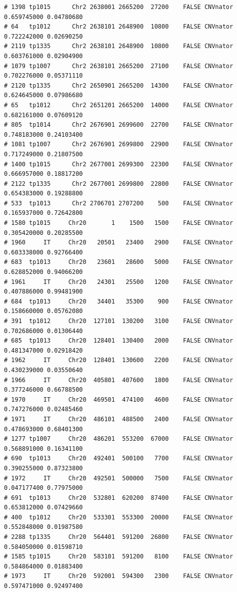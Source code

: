 \documentclass{article}\usepackage[]{graphicx}\usepackage[]{color}
\makeatletter
\newenvironment{kframe}{%
 \def\at@end@of@kframe{}%
 \ifinner\ifhmode%
  \def\at@end@of@kframe{\end{minipage}}%
  \begin{minipage}{\columnwidth}%
 \fi\fi%
 \def\FrameCommand##1{\hskip\@totalleftmargin \hskip-\fboxsep
 \colorbox{shadecolor}{##1}\hskip-\fboxsep
     \hskip-\linewidth \hskip-\@totalleftmargin \hskip\columnwidth}%
 \MakeFramed {\advance\hsize-\width
   \@totalleftmargin\z@ \linewidth\hsize
   \@setminipage}}%
 {\par\unskip\endMakeFramed%
 \at@end@of@kframe}
\newenvironment{knitrout}{}{} %
\makeatother
\begin{document}
\begin{knitrout}
\begin{kframe}
\begin{verbatim}
# 1398 tp1015      Chr2 2638001 2665200  27200    FALSE CNVnator 0.659745000 0.04780680
# 64   tp1012      Chr2 2638101 2648900  10800    FALSE CNVnator 0.722242000 0.02690250
# 2119 tp1335      Chr2 2638101 2648900  10800    FALSE CNVnator 0.603761000 0.02904900
# 1079 tp1007      Chr2 2638101 2665200  27100    FALSE CNVnator 0.702276000 0.05371110
# 2120 tp1335      Chr2 2650901 2665200  14300    FALSE CNVnator 0.624645000 0.07986680
# 65   tp1012      Chr2 2651201 2665200  14000    FALSE CNVnator 0.682161000 0.07609120
# 805  tp1014      Chr2 2676901 2699600  22700    FALSE CNVnator 0.748183000 0.24103400
# 1081 tp1007      Chr2 2676901 2699800  22900    FALSE CNVnator 0.717249000 0.21807500
# 1400 tp1015      Chr2 2677001 2699300  22300    FALSE CNVnator 0.666957000 0.18817200
# 2122 tp1335      Chr2 2677001 2699800  22800    FALSE CNVnator 0.654383000 0.19288800
# 533  tp1013      Chr2 2706701 2707200    500    FALSE CNVnator 0.165937000 0.72642800
# 1580 tp1015     Chr20       1    1500   1500    FALSE CNVnator 0.305420000 0.20285500
# 1960     IT     Chr20   20501   23400   2900    FALSE CNVnator 0.603338000 0.92766400
# 683  tp1013     Chr20   23601   28600   5000    FALSE CNVnator 0.628852000 0.94066200
# 1961     IT     Chr20   24301   25500   1200    FALSE CNVnator 0.407886000 0.99481900
# 684  tp1013     Chr20   34401   35300    900    FALSE CNVnator 0.158660000 0.05762080
# 391  tp1012     Chr20  127101  130200   3100    FALSE CNVnator 0.702686000 0.01306440
# 685  tp1013     Chr20  128401  130400   2000    FALSE CNVnator 0.481347000 0.02918420
# 1962     IT     Chr20  128401  130600   2200    FALSE CNVnator 0.430239000 0.03550640
# 1966     IT     Chr20  405801  407600   1800    FALSE CNVnator 0.377246000 0.66788500
# 1970     IT     Chr20  469501  474100   4600    FALSE CNVnator 0.747276000 0.02485460
# 1971     IT     Chr20  486101  488500   2400    FALSE CNVnator 0.478693000 0.68401300
# 1277 tp1007     Chr20  486201  553200  67000    FALSE CNVnator 0.568891000 0.16341100
# 690  tp1013     Chr20  492401  500100   7700    FALSE CNVnator 0.390255000 0.87323800
# 1972     IT     Chr20  492501  500000   7500    FALSE CNVnator 0.047177400 0.77975000
# 691  tp1013     Chr20  532801  620200  87400    FALSE CNVnator 0.653812000 0.07429660
# 400  tp1012     Chr20  533301  553300  20000    FALSE CNVnator 0.552848000 0.01987580
# 2288 tp1335     Chr20  564401  591200  26800    FALSE CNVnator 0.584050000 0.01598710
# 1585 tp1015     Chr20  583101  591200   8100    FALSE CNVnator 0.584864000 0.01883400
# 1973     IT     Chr20  592001  594300   2300    FALSE CNVnator 0.597471000 0.92497400

\end{verbatim}
\end{kframe}
\end{knitrout}
\end{document}
